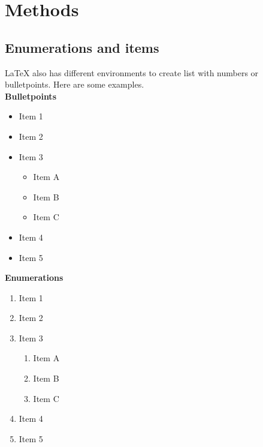 \chapter{Methods}
\label{chap:4_methods}

\lipsum[2-4]

\section{Enumerations and items}

\LaTeX{} also has different environments to create list with numbers or bulletpoints. Here are some examples.
\\\textbf{Bulletpoints}
\begin{itemize}
    \item Item 1
    \item Item 2
    \item Item 3
    \begin{itemize}
        \item Item A
        \item Item B
        \item Item C
    \end{itemize}
    \item Item 4
    \item Item 5
\end{itemize}

\textbf{Enumerations}
\begin{enumerate}
    \item Item 1
    \item Item 2
    \item Item 3
    \begin{enumerate}
        \item Item A
        \item Item B
        \item Item C
    \end{enumerate}
    \item Item 4
    \item Item 5
\end{enumerate}